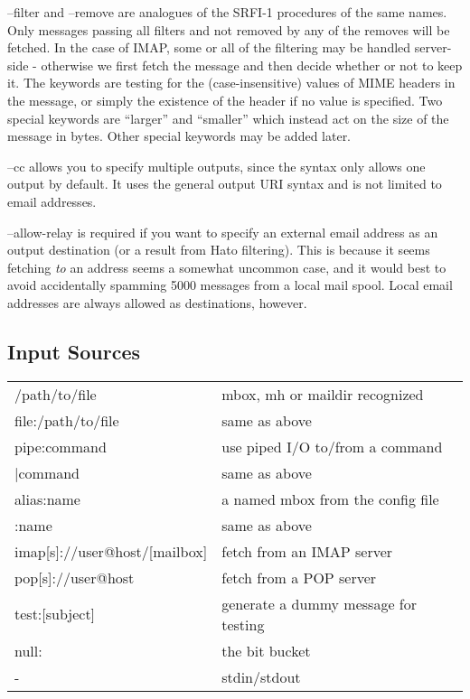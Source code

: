 --filter and --remove are analogues of the SRFI-1 procedures of the
same names.  Only messages passing all filters and not removed by any
of the removes will be fetched.  In the case of IMAP, some or all of
the filtering may be handled server-side - otherwise we first fetch
the message and then decide whether or not to keep it.  The keywords
are testing for the (case-insensitive) values of MIME headers in the
message, or simply the existence of the header if no value is
specified.  Two special keywords are ``larger'' and ``smaller'' which
instead act on the size of the message in bytes.  Other special
keywords may be added later.

--cc allows you to specify multiple outputs, since the syntax only
allows one output by default.  It uses the general output URI syntax
and is not limited to email addresses.

--allow-relay is required if you want to specify an external email
address as an output destination (or a result from Hato filtering).
This is because it seems fetching {\em to} an address seems a somewhat
uncommon case, and it would best to avoid accidentally spamming 5000
messages from a local mail spool.  Local email addresses are always
allowed as destinations, however.

\subsection{Input Sources}

\begin{tabular}{l l}
  /path/to/file        & mbox, mh or maildir recognized \\
  file:/path/to/file   & same as above \\
  pipe:command         & use piped I/O to/from a command \\
  |command             & same as above \\
  alias:name           & a named mbox from the config file \\
  :name                & same as above \\
  imap[s]://user@host/[mailbox] & fetch from an IMAP server \\
  pop[s]://user@host   & fetch from a POP server \\
  test:[subject]       & generate a dummy message for testing \\
  null:                & the bit bucket \\
  -                    & stdin/stdout \\
\end{tabular}

